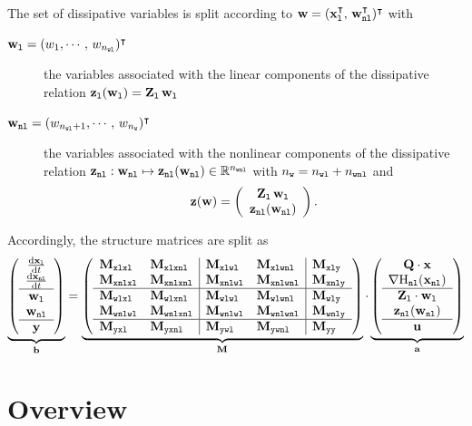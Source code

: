 \documentclass[10pt,a4paper]{article}
\begin{document}
%
The set of dissipative variables is split according to $\vw = (\vxl^\T, \, \vwnl^\T)^\T$ with 
%
\begin{description}
%
\item[$\vwl = (w_1,\cdots,\,w_\nwl)^\T$] the variables associated with the linear components of the dissipative relation $\vzl(\vwl)=\mat{Z}_{\lab l}\,\vwl$
%
\item[$\vwnl=(w_{\nwl+1},\cdots,\,w_\nw)^\T$] the variables associated with the nonlinear components of the dissipative relation $\vznl:\vwnl\mapsto\vznl(\vwnl)\in\RR^{\nwnl}$ with $\nw = \nwl+\nwnl$ and $$ \vz(\vw) = \left(\begin{array}{c}
\mat{Z}_{\lab l}\,\vwl\\
\vznl(\vwnl)
\end{array} \right).$$
%
\end{description}
%

Accordingly, the structure matrices are split as
%
\begin{equation}
\underbrace{\left(\begin{array}{c}
\D{\vxl}{t}\\
\D{\vxnl}{t}\\ \hline
\vwl\\
\vwnl\\ \hline
\vy
\end{array}\right)}_{\vec b}
 = \underbrace{\left(\begin{array}{ll|ll|l}
\M{xlxl}&\M{xlxnl}&\M{xlwl} & \M{xlwnl} & \M{xly}\\ 
\M{xnlxl}&\M{xnlxnl}&\M{xnlwl} &  \M{xnlwnl} & \M{xnly}\\ \hline
\M{wlxl}& \M{wlxnl}& \M{wlwl} & \M{wlwnl} & \M{wly}\\
\M{wnlwl}& \M{wnlxnl}& \M{wnlwl} & \M{wnlwnl} & \M{wnly}\\ \hline
\M{yxl} &\M{yxnl}&\M{ywl} & \M{ywnl} &\M{yy}
\end{array}\right)}_{\M{}}
\cdot
\underbrace{\left(\begin{array}{c}
\Q\cdot\vx\\
\nabla\Hnl(\vxnl)\\ \hline
\mat{Z}_{\lab l}\cdot\vwl\\
\vznl(\vwnl)\\ \hline
\vu
\end{array}\right) }_{\vec a}
\end{equation}
%
\tableofcontents
%
\section{Overview}
%
\end{document}
